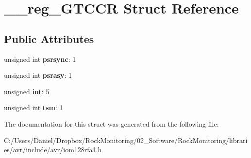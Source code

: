 \hypertarget{struct____reg___g_t_c_c_r}{}\section{\+\_\+\+\_\+reg\+\_\+\+G\+T\+C\+CR Struct Reference}
\label{struct____reg___g_t_c_c_r}
\subsection*{Public Attributes}
\begin{DoxyCompactItemize}
\item 
unsigned int {\bfseries psrsync}\+: 1\hypertarget{struct____reg___g_t_c_c_r_a26ad7d7e18f1494b2148a34b8ab939b3}{}\label{struct____reg___g_t_c_c_r_a26ad7d7e18f1494b2148a34b8ab939b3}

\item 
unsigned int {\bfseries psrasy}\+: 1\hypertarget{struct____reg___g_t_c_c_r_aed505e64ab428817651e1fb48c7b95f8}{}\label{struct____reg___g_t_c_c_r_aed505e64ab428817651e1fb48c7b95f8}

\item 
unsigned {\bfseries int}\+: 5\hypertarget{struct____reg___g_t_c_c_r_ad457dc7665744c3238057f3a0aac10e1}{}\label{struct____reg___g_t_c_c_r_ad457dc7665744c3238057f3a0aac10e1}

\item 
unsigned int {\bfseries tsm}\+: 1\hypertarget{struct____reg___g_t_c_c_r_ab76a9a9519e2b459616e397e44929fcc}{}\label{struct____reg___g_t_c_c_r_ab76a9a9519e2b459616e397e44929fcc}

\end{DoxyCompactItemize}


The documentation for this struct was generated from the following file\+:\begin{DoxyCompactItemize}
\item 
C\+:/\+Users/\+Daniel/\+Dropbox/\+Rock\+Monitoring/02\+\_\+\+Software/\+Rock\+Monitoring/libraries/avr/include/avr/iom128rfa1.\+h\end{DoxyCompactItemize}
